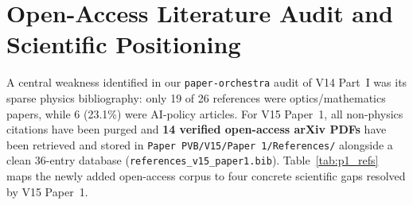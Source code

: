 \documentclass[10pt,letterpaper]{article}
\begin{document}
\vspace{4pt}

\section{Open-Access Literature Audit and Scientific Positioning}
\label{sec:lit_audit}

A central weakness identified in our \texttt{paper-orchestra} audit of V14 Part~I was its sparse physics bibliography: only 19 of 26 references were optics/mathematics papers, while 6 (23.1\%) were AI-policy articles. For V15 Paper~1, all non-physics citations have been purged and \textbf{14 verified open-access arXiv PDFs} have been retrieved and stored in \texttt{Paper PVB/V15/Paper 1/References/} alongside a clean 36-entry database (\texttt{references\_v15\_paper1.bib}). Table~\ref{tab:p1_refs} maps the newly added open-access corpus to four concrete scientific gaps resolved by V15 Paper~1.
\end{document}
